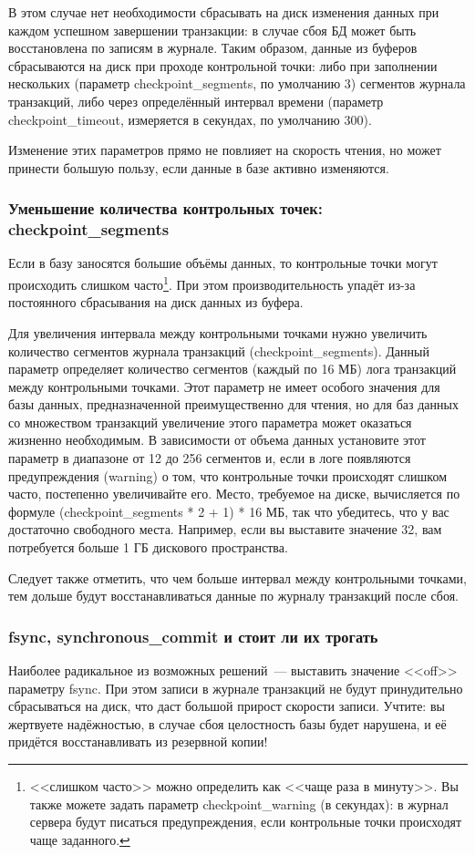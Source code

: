 В этом случае нет необходимости сбрасывать на диск изменения данных при каждом успешном завершении транзакции:
в случае сбоя БД может быть восстановлена по записям в журнале. Таким образом, данные из буферов сбрасываются на диск
при проходе контрольной точки: либо при заполнении нескольких (параметр checkpoint\_segments, по умолчанию 3) сегментов
журнала транзакций, либо через определённый интервал времени (параметр checkpoint\_timeout, измеряется в секундах, по умолчанию 300).

Изменение этих параметров прямо не повлияет на скорость чтения, но может принести большую пользу, если данные в базе активно изменяются.

\subsubsection{Уменьшение количества контрольных точек: checkpoint\_segments}
Если в базу заносятся большие объёмы данных, то контрольные точки могут происходить слишком часто\footnote{<<слишком часто>>
можно определить как <<чаще раза в минуту>>. Вы также можете задать параметр checkpoint\_warning (в секундах):
в журнал сервера будут писаться предупреждения, если контрольные точки происходят чаще заданного.}.
При этом производительность упадёт из-за постоянного сбрасывания на диск данных из буфера.

Для увеличения интервала между контрольными точками нужно увеличить количество сегментов журнала транзакций (checkpoint\_segments).
Данный параметр определяет количество сегментов (каждый по 16 МБ) лога транзакций между контрольными точками.
Этот параметр не имеет особого значения для базы данных, предназначенной преимущественно для чтения, но для баз данных со
множеством транзакций увеличение этого параметра может оказаться жизненно необходимым. В зависимости от объема данных
установите этот параметр в диапазоне от 12 до 256 сегментов и, если в логе появляются предупреждения (warning) о том, что
контрольные точки происходят слишком часто, постепенно увеличивайте его. Место, требуемое на диске, вычисляется по формуле
(checkpoint\_segments * 2 + 1) * 16 МБ, так что убедитесь, что у вас достаточно свободного места. Например, если вы выставите
значение 32, вам потребуется больше 1 ГБ дискового пространства.

Следует также отметить, что чем больше интервал между контрольными точками, тем дольше будут восстанавливаться данные по
журналу транзакций после сбоя.

\subsubsection{fsync, synchronous\_commit и стоит ли их трогать}
Наиболее радикальное из возможных решений~--- выставить значение <<off>> параметру fsync. При этом записи в журнале транзакций не
будут принудительно сбрасываться на диск, что даст большой прирост скорости записи. Учтите: вы жертвуете надёжностью, в случае
сбоя целостность базы будет нарушена, и её придётся восстанавливать из резервной копии!

